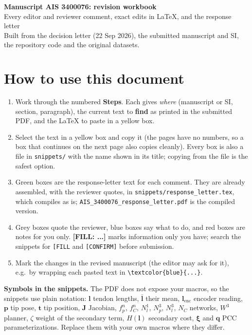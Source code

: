 \documentclass[10pt,a4paper]{article}
\newcommand{\FILL}[1]{\textcolor{orange!85!black}{\textbf{[FILL: #1]}}}
\begin{document}
\begin{center}
{\LARGE\bfseries Manuscript AIS 3400076: revision workbook}\\[4pt]
{\large Every editor and reviewer comment, exact edits in LaTeX, and the response letter}\\[4pt]
{\small Built from the decision letter (22 Sep 2026), the submitted manuscript and SI, the repository code and the original datasets.}
\end{center}

\section*{How to use this document}
\begin{enumerate}
\item Work through the numbered \textbf{Steps}. Each gives \emph{where} (manuscript or SI, section, paragraph), the current text to \textbf{find} as printed in the submitted PDF, and the LaTeX to paste in a yellow box.
\item Select the text in a yellow box and copy it (the pages have no numbers, so a box that continues on the next page also copies cleanly). Every box is also a file in \texttt{snippets/} with the name shown in its title; copying from the file is the safest option.
\item Green boxes are the response-letter text for each comment. They are already assembled, with the reviewer quotes, in \texttt{snippets/response\_letter.tex}, which compiles as is; \texttt{AIS\_3400076\_response\_letter.pdf} is the compiled version.
\item Grey boxes quote the reviewer, blue boxes say what to do, and red boxes are notes for you only. \FILL{...} marks information only you have; search the snippets for \texttt{[FILL} and \texttt{[CONFIRM]} before submission.
\item Mark the changes in the revised manuscript (the editor may ask for it), e.g.\ by wrapping each pasted text in \verb|\textcolor{blue}{...}|.
\end{enumerate}

\textbf{Symbols in the snippets.} The PDF does not expose your macros, so the snippets use plain notation: $\mathbf{l}$ tendon lengths, $\bar{\mathbf{l}}$ their mean, $\mathbf{l}_{\mathrm{enc}}$ encoder reading, $\mathbf{p}$ tip pose, $\mathbf{t}$ tip position, $\mathbf{J}$ Jacobian, $f_p^n$, $f_C^n$, $N_l^1$, $N_p^3$, $N_l^3$, $N_C$ networks, $W^3$ planner, $\zeta$ weight of the secondary term, $H(\mathbf{l})$ secondary cost, $\boldsymbol{\xi}$ and $\mathbf{q}$ PCC parameterizations. Replace them with your own macros where they differ.
\end{document}
